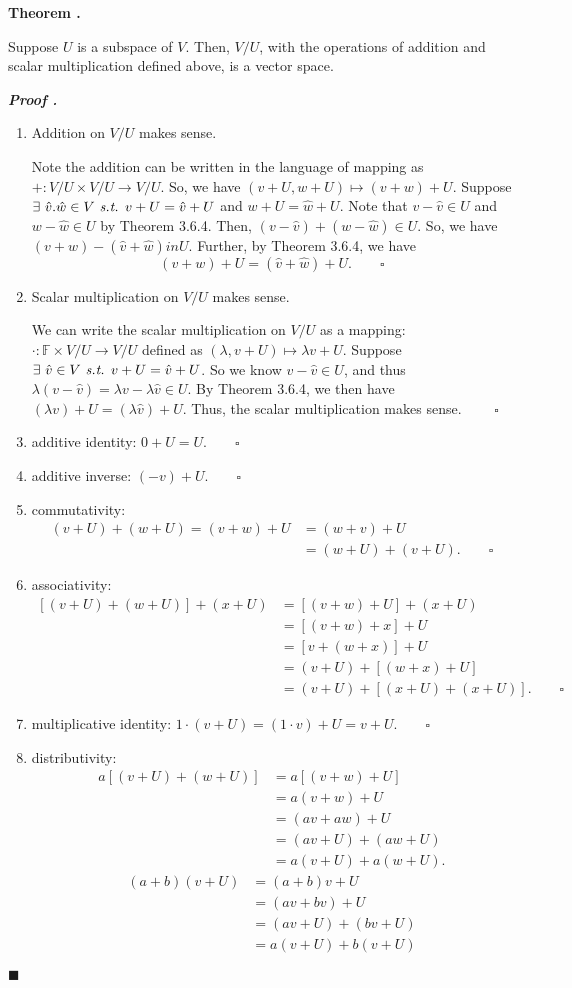 \documentclass[11pt, letterpaper]{article}
\newcounter{index}[subsection]
\newenvironment*{thm}[1]{\begin{tcolorbox}\par\noindent\textbf{Theorem \thesubsection.\stepcounter{index}\theindex\ #1} \par}{\par\end{tcolorbox}}
\newcounter{nprf}[subsection]
\newenvironment*{prf}{\par\indent\textbf{\textit{Proof \stepcounter{nprf}\thenprf.}}}{\hfill$\blacksquare$\par}
\def\F{\mathbb{F}}
\def\st{\emph{ s.t. }}
\def\pqde{\qquad\square}
\begin{document}
\begin{thm}{}
	Suppose $U$ is a subspace of $V$. Then, $V/U$, with the operations of addition and scalar multiplication defined above, is a vector space.	
\end{thm}
\begin{prf}
	\begin{enumerate}
		\item Addition on $V/U$ makes sense.\par Note the addition can be written in the language of mapping as $+:V/U\times V/U\to V/U$. So, we have $(v+U,w+U)\mapsto(v+w)+U$. Suppose $\exists\ \hat{v}.\hat{w}\in V\st v+U=\hat{v}+U$ and $w+U=\hat{w}+U$. Note that $v-\hat{v}\in U$ and $w-\hat{w}\in U$ by Theorem 3.6.4. Then, $(v-\hat{v})+(w-\hat{w})\in U$. So, we have $(v+w)-(\hat{v}+\hat{w})in U$. Further, by Theorem 3.6.4, we have \[(v+w)+U=(\hat{v}+\hat{w})+U.\pqde\]
		\item Scalar multiplication on $V/U$ makes sense.\par We can write the scalar multiplication on $V/U$ as a mapping: $\cdot: \F\times V/U\to V/U$ defined as $(\lambda,v+U)\mapsto\lambda v+U$. Suppose $\exists\ \hat{v}\in V\st v+U=\hat{v}+U$. So we know $v-\hat{v}\in U$, and thus $\lambda(v-\hat{v})=\lambda v-\lambda\hat{v}\in U$. By Theorem 3.6.4, we then have $(\lambda v)+U=(\lambda\hat{v})+ U$. Thus, the scalar multiplication makes sense. $\pqde$
		\item additive identity: $0+U=U.\pqde$
		\item additive inverse: $(-v)+U.\pqde$
		\item commutativity: \[\begin{aligned}(v+U)+(w+U)=(v+w)+U&=(w+v)+U\\&=(w+U)+(v+U).\pqde\end{aligned}\]
		\item associativity: \[\begin{aligned} [(v+U)+(w+U)]+(x+U)&=[(v+w)+U]+(x+U)\\&=[(v+w)+x]+U\\&=[v+(w+x)]+U\\&=(v+U)+[(w+x)+U]\\&=(v+U)+[(x+U)+(x+U)].\pqde\end{aligned}\]
		\item multiplicative identity: $1\cdot(v+U)=(1\cdot v)+U=v+U.\pqde$
		\item distributivity: \[\begin{aligned}a[(v+U)+(w+U)]&=a[(v+w)+U]\\&=a(v+w)+U\\&=(av+aw)+U\\&=(av+U)+(aw+U)\\&=a(v+U)+a(w+U).\end{aligned}\]\[\begin{aligned}(a+b)(v+U)&=(a+b)v+U\\&=(av+bv)+U\\&=(av+U)+(bv+U)\\&=a(v+U)+b(v+U)\end{aligned}\]
	\end{enumerate}	
\end{prf}
\end{document}
